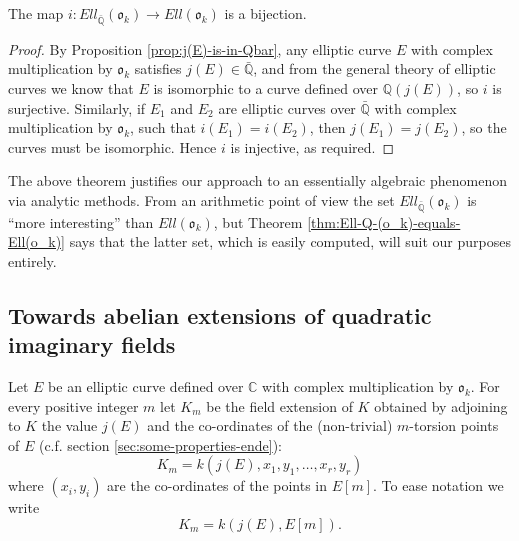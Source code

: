 \begin{thm}
  \label{thm:Ell-Q-(o_k)-equals-Ell(o_k)}
  The map $i : Ell_{\bar{\mathbb{Q}}}(\mathfrak{o}_{k}) \rightarrow
  Ell(\mathfrak{o}_{k})$ is a bijection.
\end{thm}
\begin{proof}
  By Proposition \ref{prop:j(E)-is-in-Qbar}, any elliptic curve $E$ with complex
  multiplication by $\mathfrak{o}_{k}$ satisfies $j(E) \in \bar{\mathbb{Q}}$, and
  from the general theory of elliptic curves we know that $E$ is isomorphic to a
  curve defined over $\mathbb{Q}(j(E))$, so $i$ is surjective.  Similarly, if $E_{1}$
  and $E_{2}$ are elliptic curves over $\bar{\mathbb{Q}}$ with complex multiplication
  by $\mathfrak{o}_{k}$, such that $i(E_{1}) = i(E_{2})$, then $j(E_{1}) = j(E_{2})$,
  so the curves must be isomorphic.  Hence $i$ is injective, as required.
\end{proof}
The above theorem justifies our approach to an essentially algebraic phenomenon via
analytic methods.  From an arithmetic point of view the set
$Ell_{\bar{\mathbb{Q}}}(\mathfrak{o}_{k})$ is ``more interesting'' than
$Ell(\mathfrak{o}_{k})$, but Theorem \ref{thm:Ell-Q-(o_k)-equals-Ell(o_k)} says that
the latter set, which is easily computed, will suit our purposes entirely.

\subsection{Towards abelian extensions of quadratic imaginary fields}
\label{sec:towards-abel-extens}

Let $E$ be an elliptic curve defined over $\mathbb{C}$ with complex multiplication by
$\mathfrak{o}_{k}$.  For every positive integer $m$ let $K_{m}$ be the field
extension of $K$ obtained by adjoining to $K$ the value $j(E)$ and the co-ordinates
of the (non-trivial) $m$-torsion points of $E$ (c.f. section
\ref{sec:some-properties-ende}):
\begin{equation}
  \label{eq:defn-of-K_m}
  K_{m} = k(j(E),x_{1},y_{1},\ldots,x_{r},y_{r})
\end{equation}
where $(x_{i},y_{i})$ are the co-ordinates of the points in $E[m]$.  To ease notation
we write
\begin{equation*}
  K_{m} = k(j(E),E[m]).
\end{equation*}

